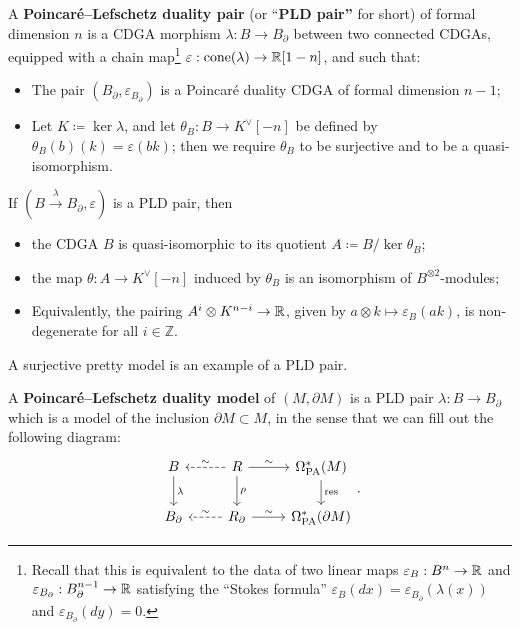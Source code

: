 \begin{definition}
  A \textbf{Poincaré--Lefschetz duality pair} (or ``\textbf{PLD pair''} for short) of formal dimension $n$ is a CDGA morphism $\lambda : B \to B_{\partial}$ between two connected CDGAs, equipped with a chain map\footnote{Recall that this is equivalent to the data of two linear maps $\varepsilon_{B} : B^{n} \to \mathbb{R}$ and $\varepsilon_{B_{\partial}} : B_{\partial}^{n-1} \to \mathbb{R}$ satisfying the ``Stokes formula'' $\varepsilon_{B}(dx) = \varepsilon_{B_{\partial}}(\lambda(x))$ and $\varepsilon_{B_{\partial}}(dy) = 0$.} $\varepsilon : \operatorname{cone}(\lambda) \to \mathbb{R}[1-n]$, and such that:
  \begin{itemize}
  \item The pair $(B_{\partial}, \varepsilon_{B_{\partial}})$ is a Poincaré duality CDGA of formal dimension $n-1$;
  \item Let $K \coloneqq \ker \lambda$, and let $\theta_{B} : B \to K^{\vee}[-n]$ be defined by $\theta_{B}(b)(k) = \varepsilon(bk)$; then we require $\theta_{B}$ to be surjective and to be a quasi-isomorphism.
  \end{itemize}
\end{definition}

If $(B \xrightarrow{\lambda} B_{\partial}, \varepsilon)$ is a PLD pair, then
\begin{itemize}
\item the CDGA $B$ is quasi-isomorphic to its quotient $A \coloneqq B / \ker \theta_{B}$;
\item the map $\theta : A \to K^{\vee}[-n]$ induced by $\theta_{B}$ is an isomorphism of $B^{\otimes 2}$-modules;
\item Equivalently, the pairing $A^{i} \otimes K^{n-i} \to \mathbb{R}$, given by $a \otimes k \mapsto \varepsilon_{B}(ak)$, is non-degenerate for all $i \in \mathbb{Z}$.
\end{itemize}

\begin{example}
  A surjective pretty model is an example of a PLD pair.
\end{example}

\begin{definition}
  A \textbf{Poincaré--Lefschetz duality model} of $(M, \partial M)$ is a PLD pair $\lambda : B \to B_{\partial}$ which is a model of the inclusion $\partial M \subset M$, in the sense that we can fill out the following diagram:
  \[ \begin{tikzcd}
      B \ar[d, "\lambda"] & R \ar[d, "\rho"] \ar[l, dashed, "\sim" swap] \ar[r, "\sim"] & \OmPA^{*}(M) \ar[d, "\text{res}"] \\
      B_{\partial} & R_{\partial} \ar[l, dashed, "\sim" swap] \ar[r, "\sim"] & \OmPA^{*}(\partial M)
    \end{tikzcd}
  . \]
\end{definition}

